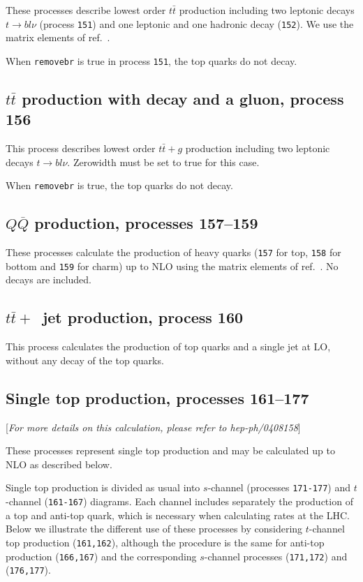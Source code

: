 \documentclass[12pt]{article}
\begin{document}
These processes describe lowest order $t \bar{t}$ production 
including two leptonic decays $t \to b l \nu$ (process {\tt 151}) and 
one leptonic and one hadronic decay ({\tt 152}).
We use the matrix elements of ref.~\cite{Kleiss:1988xr}.


When {\tt removebr} is true in process {\tt 151},
the top quarks do not decay.

\subsection{$t\bar{t}$ production with decay and a gluon, process 156}
This process describes lowest order $t \bar{t}+g$ production 
including two leptonic decays $t \to b l \nu$. Zerowidth must be set to true for 
this case.

When {\tt removebr} is true, the top quarks do not decay.

\subsection{$Q\overline{Q}$ production, processes 157--159}
These processes calculate the production of heavy quarks
({\tt 157} for top, {\tt 158} for bottom and {\tt 159} for charm) up to NLO 
using the matrix elements of ref.~\cite{Nason:1987xz}. No decays
are included.

\subsection{$t{\bar t}+$~jet production, process 160}
This process calculates the production of top quarks and a single jet
at LO, without any decay of the top quarks.

\subsection{Single top production, processes 161--177}
\label{subsec:stop}

\begin{center}
[{\it For more details on this calculation, please refer to hep-ph/0408158}]
\end{center}

These processes represent single top production and may be calculated up to
NLO as described below.

Single top production is divided as usual into $s$-channel 
(processes {\tt 171-177}) and $t$-channel ({\tt 161-167})
diagrams. Each channel includes separately the production of a top
and anti-top quark, which is necessary when calculating rates at the LHC.
Below we illustrate the different use of these processes by considering
$t$-channel top production ({\tt 161,162}), although the procedure is the same
for anti-top production ({\tt 166,167}) and the corresponding $s$-channel
processes ({\tt 171,172}) and ({\tt 176,177}).
\end{document}
